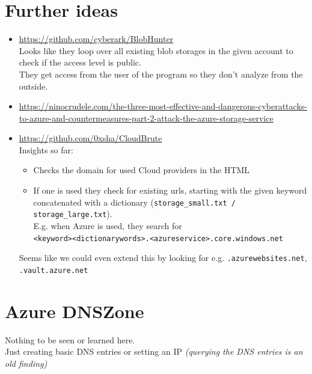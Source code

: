 \documentclass[12pt]{article}
\begin{document}
\section*{Further ideas}
\begin{itemize}
    \item \url{https://github.com/cyberark/BlobHunter} \\
    Looks like they loop over all existing blob storages in the given account to check if the access level is public. \\
    They get access from the user of the program so they don't analyze from the outside.
    \item \url{https://ninocrudele.com/the-three-most-effective-and-dangerous-cyberattacks-to-azure-and-countermeasures-part-2-attack-the-azure-storage-service}
        \item \url{https://github.com/0xsha/CloudBrute} \\
    Insights so far:
    \begin{itemize}
        \item Checks the domain for used Cloud providers in the HTML
        \item If one is used they check for existing urls, starting with the given keyword concatenated with a dictionary (\verb|storage_small.txt / storage_large.txt|). \\
        E.g. when Azure is used, they search for \\ \verb|<keyword><dictionarywords>.<azureservice>.core.windows.net|
    \end{itemize}
    Seems like we could even extend this by looking for e.g. \verb|.azurewebsites.net|, \verb|.vault.azure.net|
\end{itemize}


\section*{Azure DNSZone}
Nothing to be seen or learned here. \\
Just creating basic DNS entries or setting an IP \textit{(querying the DNS entries is an old finding)}
\end{document}

